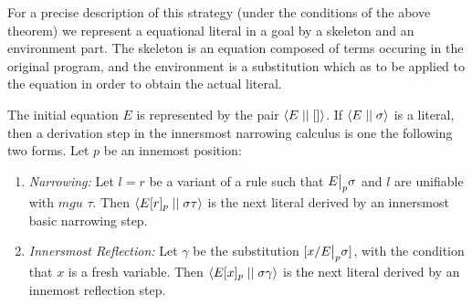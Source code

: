 For a precise description of this strategy (under the conditions of the above theorem) we represent a equational literal in a goal by a skeleton and an environment part. The skeleton is an equation composed of terms occuring in the original program, and the environment is a substitution which as to be applied to the equation in order to obtain  the actual literal.

\begin{definition}
     The initial equation $E$ is represented by the pair $\left\langle E \mid\mid [] \right\rangle$. If $\left\langle E \mid\mid \sigma \right\rangle$ is a literal, then a derivation step in the innersmost narrowing calculus is one the following two forms. Let $p$ be an innemost position:
     \begin{enumerate}
         \item \textit{Narrowing:} Let $l = r$ be a variant of a rule such that $\restr{E}{p}\sigma$ and $l$ are unifiable with $mgu$ $\tau$. Then $\left\langle E[r]_p \mid\mid \sigma \tau \right\rangle$ is the next literal derived by an innersmost basic narrowing step.
         \item \textit{Innersmost Reflection:} Let $\gamma$ be the substitution $[x / \restr{E}{p}\sigma]$, with the condition that $x$ is a fresh variable. Then $\left\langle E[x]_p \mid\mid \sigma \gamma \right\rangle$ is the next literal derived by an innemost reflection step.
     \end{enumerate}
\end{definition}

